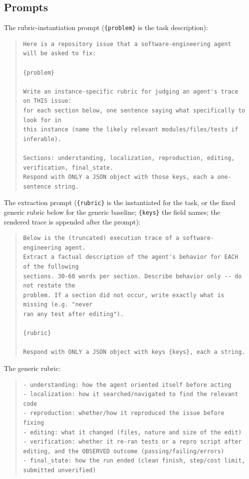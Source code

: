 \subsection{Prompts}
\label{app:prompts}

The rubric-instantiation prompt (\texttt{\{problem\}} is the task description):
\begin{quote}\small\begin{verbatim}
Here is a repository issue that a software-engineering agent will be asked to fix:

{problem}

Write an instance-specific rubric for judging an agent's trace on THIS issue:
for each section below, one sentence saying what specifically to look for in
this instance (name the likely relevant modules/files/tests if inferable).

Sections: understanding, localization, reproduction, editing, verification, final_state.
Respond with ONLY a JSON object with those keys, each a one-sentence string.
\end{verbatim}\end{quote}

The extraction prompt (\texttt{\{rubric\}} is the instantiated \trubric{} for the task, or the fixed generic rubric below for the generic baseline; \texttt{\{keys\}} the field names; the rendered trace is appended after the prompt):
\begin{quote}\small\begin{verbatim}
Below is the (truncated) execution trace of a software-engineering agent.
Extract a factual description of the agent's behavior for EACH of the following
sections. 30-60 words per section. Describe behavior only -- do not restate the
problem. If a section did not occur, write exactly what is missing (e.g. "never
ran any test after editing").

{rubric}

Respond with ONLY a JSON object with keys {keys}, each a string.
\end{verbatim}\end{quote}

The generic rubric:
\begin{quote}\small\begin{verbatim}
- understanding: how the agent oriented itself before acting
- localization: how it searched/navigated to find the relevant code
- reproduction: whether/how it reproduced the issue before fixing
- editing: what it changed (files, nature and size of the edit)
- verification: whether it re-ran tests or a repro script after editing, and the OBSERVED outcome (passing/failing/errors)
- final_state: how the run ended (clean finish, step/cost limit, submitted unverified)
\end{verbatim}\end{quote}
